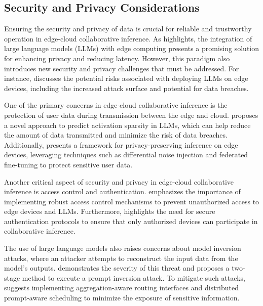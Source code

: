 \documentclass[11pt,a4paper]{article}
\begin{document}
\subsection{Security and Privacy Considerations}


Ensuring the security and privacy of data is crucial for reliable and trustworthy operation in edge-cloud collaborative inference. As \cite{doi:10.1109/mnet.2025.3539338} highlights, the integration of large language models (LLMs) with edge computing presents a promising solution for enhancing privacy and reducing latency. However, this paradigm also introduces new security and privacy challenges that must be addressed. For instance, \cite{doi:10.1109/compsac61105.2024.00206} discusses the potential risks associated with deploying LLMs on edge devices, including the increased attack surface and potential for data breaches.

One of the primary concerns in edge-cloud collaborative inference is the protection of user data during transmission between the edge and cloud. \cite{doi:10.1109/sp61157.2025.00182} proposes a novel approach to predict activation sparsity in LLMs, which can help reduce the amount of data transmitted and minimize the risk of data breaches. Additionally, \cite{doi:10.56127/ijst.v3i3.1958} presents a framework for privacy-preserving inference on edge devices, leveraging techniques such as differential noise injection and federated fine-tuning to protect sensitive user data.

Another critical aspect of security and privacy in edge-cloud collaborative inference is access control and authentication. \cite{arxiv:2502.11349} emphasizes the importance of implementing robust access control mechanisms to prevent unauthorized access to edge devices and LLMs. Furthermore, \cite{doi:10.1145/3788870} highlights the need for secure authentication protocols to ensure that only authorized devices can participate in collaborative inference.

The use of large language models also raises concerns about model inversion attacks, where an attacker attempts to reconstruct the input data from the model's outputs. \cite{doi:10.1109/sp61157.2025.00160} demonstrates the severity of this threat and proposes a two-stage method to execute a prompt inversion attack. To mitigate such attacks, \cite{doi:10.1145/3642970.3655844} suggests implementing aggregation-aware routing interfaces and distributed prompt-aware scheduling to minimize the exposure of sensitive information.
\end{document}
